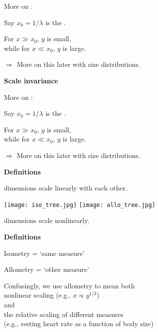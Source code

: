 More on :

Say $x_0 = 1/\lambda$ is the .

For $x \gg x_0$, $y$ is small,\\
while for $x \ll x_0$, $y$ is large.

\inv

$\Rightarrow$ More on this later with size distributions.


  \textbf{Scale invariance}

More on :

Say $x_0 = 1/\lambda$ is the .

For $x \gg x_0$, $y$ is small,\\
while for $x \ll x_0$, $y$ is large.

$\Rightarrow$ More on this later with size distributions.




  \textbf{Definitions}

 dimensions scale linearly with each other.

\begin{center}
\texttt{[image: iso\_tree.jpg]}
\hfill
\texttt{[image: allo\_tree.jpg]}
\end{center}

\mbox{} \hfill {} dimensions scale nonlinearly.


  \textbf{Definitions}

Isometry = `same measure'

Allometry = `other measure'

\inv

Confusingly, we use allometry to mean both\\
 nonlinear scaling (e.g., $x \propto y^{1/3}$)\\
and\\
 the relative scaling of different measures\\
(e.g., resting heart rate as a function of body size)


